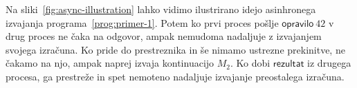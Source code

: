 Na sliki~\ref{fig:async-illustration} lahko vidimo ilustrirano idejo asinhronega izvajanja programa~\ref{prog:primer-1}. 
Potem ko prvi proces pošlje $\mathsf{opravilo}\ 42$ v drug proces ne čaka na odgovor, ampak nemudoma nadaljuje z izvajanjem svojega izračuna. Ko pride do prestreznika in še nimamo ustrezne prekinitve, ne čakamo na njo, ampak naprej izvaja kontinuacijo $M_2$. Ko dobi $\mathsf{rezultat}$ iz drugega procesa, ga prestreže in spet nemoteno nadaljuje izvajanje preostalega izračuna.

%	

